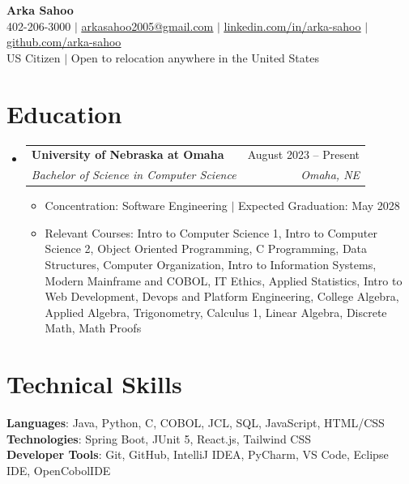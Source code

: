 \documentclass[letterpaper,11pt]{article}
\makeatletter
\newcommand{\resumeItem}[1]{
  \item\small{
    {#1 \vspace{-2pt}}
  }
}
\newcommand{\resumeSubheading}[4]{
  \vspace{-2pt}\item
    \begin{tabular*}{0.97\textwidth}[t]{l@{\extracolsep{\fill}}r}
      \textbf{#1} & #2 \\
      \textit{\small#3} & \textit{\small #4} \\
    \end{tabular*}\vspace{-7pt}
}
\newcommand{\resumeSubHeadingListStart}{\begin{itemize}[leftmargin=0.15in, label={}]}
\newcommand{\resumeSubHeadingListEnd}{\end{itemize}}
\newcommand{\resumeItemListStart}{\begin{itemize}}
\newcommand{\resumeItemListEnd}{\end{itemize}\vspace{-5pt}}
\makeatother
\begin{document}

\begin{center}
    \textbf{\Huge Arka Sahoo} \\ \vspace{1pt}
    \small 402-206-3000
    $|$
    \href{mailto:arkasahoo2005@gmail.com}{\underline{arkasahoo2005@gmail.com}}
    $|$
    \href{https://linkedin.com/in/arka-sahoo}{\underline{linkedin.com/in/arka-sahoo}} $|$
    \href{https://github.com/arka-sahoo}{\underline{github.com/arka-sahoo}} \vspace{1pt} \\
    US Citizen $|$ Open to relocation anywhere in the United States
\end{center}


\section{Education}
  \resumeSubHeadingListStart
    \resumeSubheading
      {University of Nebraska at Omaha}{August 2023 -- Present}
      {Bachelor of Science in Computer Science}{Omaha, NE}
    \resumeItemListStart
        \resumeItem{Concentration: Software Engineering $|$ Expected Graduation: May 2028}
        \resumeItem{Relevant Courses: Intro to Computer Science 1, Intro to Computer Science 2, Object Oriented Programming, C Programming, Data Structures, Computer Organization, Intro to Information Systems, Modern Mainframe and COBOL, IT Ethics, Applied Statistics, Intro to Web Development, Devops and Platform Engineering, College Algebra, Applied Algebra, Trigonometry, Calculus 1, Linear Algebra, Discrete Math, Math Proofs}
    \resumeItemListEnd
  \resumeSubHeadingListEnd

\section{Technical Skills}
\begin{itemize}[leftmargin=0.15in, label={}]
  \small{\item{
   \textbf{Languages}{: Java, Python, C, COBOL, JCL, SQL, JavaScript, HTML/CSS} \\  
   \textbf{Technologies}{: Spring Boot, JUnit 5, React.js, Tailwind CSS} \\  
   \textbf{Developer Tools}{: Git, GitHub, IntelliJ IDEA, PyCharm, VS Code, Eclipse IDE, OpenCobolIDE} \\
  }}
\end{itemize}
\end{document}
